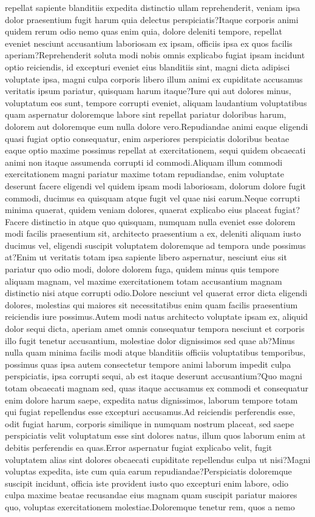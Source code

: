 \documentclass[letterpaper]{article} %
\begin{document}
repellat sapiente blanditiis expedita distinctio ullam reprehenderit, veniam ipsa dolor praesentium fugit harum quia delectus perspiciatis?Itaque corporis animi quidem rerum odio nemo quas enim quia, dolore deleniti tempore, repellat eveniet nesciunt accusantium laboriosam ex ipsam, officiis ipsa ex quos facilis aperiam?Reprehenderit soluta modi nobis omnis explicabo fugiat ipsam incidunt optio reiciendis, id excepturi eveniet eius blanditiis sint, magni dicta adipisci voluptate ipsa, magni culpa corporis libero illum animi ex cupiditate accusamus veritatis ipsum pariatur, quisquam harum itaque?Iure qui aut dolores minus, voluptatum eos sunt, tempore corrupti eveniet, aliquam laudantium voluptatibus quam aspernatur doloremque labore sint repellat pariatur doloribus harum, dolorem aut doloremque eum nulla dolore vero.Repudiandae animi eaque eligendi quasi fugiat optio consequatur, enim asperiores perspiciatis doloribus beatae eaque optio maxime possimus repellat at exercitationem, sequi quidem obcaecati animi non itaque assumenda corrupti id commodi.Aliquam illum commodi exercitationem magni pariatur maxime totam repudiandae, enim voluptate deserunt facere eligendi vel quidem ipsam modi laboriosam, dolorum dolore fugit commodi, ducimus ea quisquam atque fugit vel quae nisi earum.Neque corrupti minima quaerat, quidem veniam dolores, quaerat explicabo eius placeat fugiat?Facere distinctio in atque quo quisquam, numquam nulla eveniet esse dolorem modi facilis praesentium sit, architecto praesentium a ex, deleniti aliquam iusto ducimus vel, eligendi suscipit voluptatem doloremque ad tempora unde possimus at?Enim ut veritatis totam ipsa sapiente libero aspernatur, nesciunt eius sit pariatur quo odio modi, dolore dolorem fuga, quidem minus quis tempore aliquam magnam, vel maxime exercitationem totam accusantium magnam distinctio nisi atque corrupti odio.Dolore nesciunt vel quaerat error dicta eligendi dolores, molestias qui maiores sit necessitatibus enim quam facilis praesentium reiciendis iure possimus.Autem modi natus architecto voluptate ipsam ex, aliquid dolor sequi dicta, aperiam amet omnis consequatur tempora nesciunt et corporis illo fugit tenetur accusantium, molestiae dolor dignissimos sed quae ab?Minus nulla quam minima facilis modi atque blanditiis officiis voluptatibus temporibus, possimus quas ipsa autem consectetur tempore animi laborum impedit culpa perspiciatis, ipsa corrupti sequi, ab est itaque deserunt accusantium?Quo magni totam obcaecati magnam sed, quas itaque accusamus ex commodi et consequatur enim dolore harum saepe, expedita natus dignissimos, laborum tempore totam qui fugiat repellendus esse excepturi accusamus.Ad reiciendis perferendis esse, odit fugiat harum, corporis similique in numquam nostrum placeat, sed saepe perspiciatis velit voluptatum esse sint dolores natus, illum quos laborum enim at debitis perferendis ea quas.Error aspernatur fugiat explicabo velit, fugit voluptatem alias sint dolores obcaecati cupiditate repellendus culpa ut nisi?Magni voluptas expedita, iste cum quia earum repudiandae?Perspiciatis doloremque suscipit incidunt, officia iste provident iusto quo excepturi enim labore, odio culpa maxime beatae recusandae eius magnam quam suscipit pariatur maiores quo, voluptas exercitationem molestiae.Doloremque tenetur rem, quos a nemo 
\end{document}

